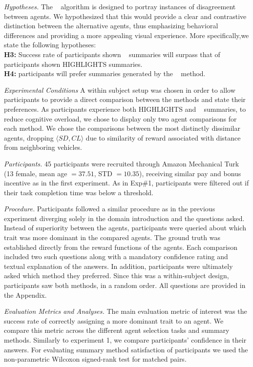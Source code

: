 \emph{Hypotheses.} 
The \disalg~ algorithm is designed to portray instances of disagreement between
agents. We hypothesized that this would provide a clear and contrastive distinction between the alternative agents, thus emphasizing behavioral differences and providing a more appealing visual experience.
More specifically,we state the following hypotheses:\\ 
\textbf{H3:} Success rate of participants shown \disalg~  summaries will surpass that of participants shown HIGHLIGHTS summaries.  
\\
\textbf{H4:} participants will prefer summaries generated by the \disalg~ method.



\emph{Experimental Conditions}
A within subject setup was chosen in order to allow participants to provide a
direct comparison between the methods and state their preferences. As
participants experience both HIGHLIGHTS and \disalg~ summaries, to reduce cognitive overload, we chose to display only two agent comparisons for each
method. We chose the comparisons between the most distinctly dissimilar agents,
dropping $\langle SD,CL\rangle$ due to similarity of reward associated with
distance from neighboring vehicles. 

\emph{Participants.} 45 participants were recruited through Amazon Mechanical
Turk (13 female, mean age $= 37.51$, STD $= 10.35$), receiving similar pay and
bonus incentive as in the first experiment.
As in Exp\#1, participants were filtered out if their task completion time was below a threshold.

\emph{Procedure.} Participants followed a similar procedure as in the previous
experiment diverging solely in the domain introduction and the questions asked.
Instead of superiority between the agents, participants were queried about which
trait was more dominant in the compared agents. The ground truth was established
directly from the reward functions of the agents. Each comparison included two
such questions along with a mandatory confidence rating and textual explanation of the answers. In addition, participants were ultimately asked which method they preferred. Since this was a within-subject design, participants saw both methods, in a random order. All questions are provided in the Appendix.


\emph{Evaluation Metrics and Analyses.} 
The main evaluation metric of interest was the success rate of correctly assigning a more dominant trait to an agent. We compare this metric across the
different agent selection tasks and summary methods. Similarly to experiment 1, we compare participants’ confidence in their answers. For evaluating summary method satisfaction of participants we used the non-parametric Wilcoxon signed-rank test \cite{wilcoxon1947probability} for matched pairs.